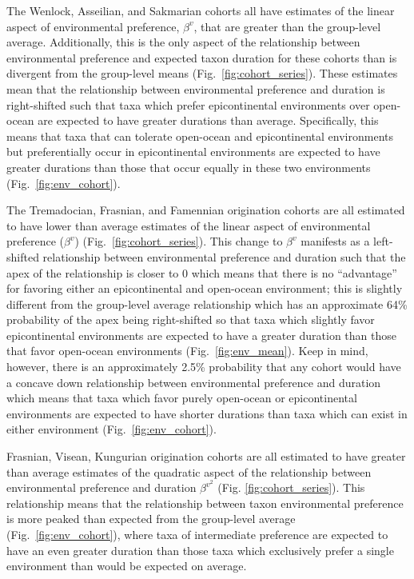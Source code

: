 \documentclass[11pt]{article}
\begin{document}
The Wenlock, Asseilian, and Sakmarian cohorts all have estimates of the linear aspect of environmental preference, \(\beta^{v}\), that are greater than the group-level average. Additionally, this is the only aspect of the relationship between environmental preference and expected taxon duration for these cohorts than is divergent from the group-level means (Fig.~\ref{fig:cohort_series}). These estimates mean that the relationship between environmental preference and duration is right-shifted such that taxa which prefer epicontinental environments over open-ocean are expected to have greater durations than average. Specifically, this means that taxa that can tolerate open-ocean and epicontinental environments but preferentially occur in epicontinental environments are expected to have greater durations than those that occur equally in these two environments (Fig.~\ref{fig:env_cohort}).


The Tremadocian, Frasnian, and Famennian origination cohorts are all estimated to have lower than average estimates of the linear aspect of environmental preference (\(\beta^{v}\)) (Fig.~\ref{fig:cohort_series}). This change to \(\beta^{v}\) manifests as a left-shifted relationship between environmental preference and duration such that the apex of the relationship is closer to 0 which means that there is no ``advantage'' for favoring either an epicontinental and open-ocean environment; this is slightly different from the group-level average relationship which has an approximate 64\% probability of the apex being right-shifted so that taxa which slightly favor epicontinental environments are expected to have a greater duration than those that favor open-ocean environments (Fig.~\ref{fig:env_mean}). Keep in mind, however, there is an approximately 2.5\% probability that any cohort would have a concave down relationship between environmental preference and duration which means that taxa which favor purely open-ocean or epicontinental environments are expected to have shorter durations than taxa which can exist in either environment (Fig.~\ref{fig:env_cohort}).

Frasnian, Visean, Kungurian origination cohorts are all estimated to have greater than average estimates of the quadratic aspect of the relationship between environmental preference and duration \(\beta^{v^{2}}\) (Fig. \ref{fig:cohort_series}). This relationship means that the relationship between taxon environmental preference is more peaked than expected from the group-level average (Fig.~\ref{fig:env_cohort}), where taxa of intermediate preference are expected to have an even greater duration than those taxa which exclusively prefer a single environment than would be expected on average.
\end{document}
